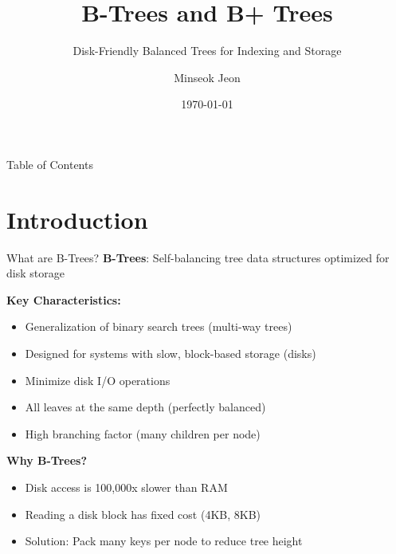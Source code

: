 \documentclass[aspectratio=169]{beamer}
\title{B-Trees and B+ Trees}
\subtitle{Disk-Friendly Balanced Trees for Indexing and Storage}
\author{Minseok Jeon}
\institute{DGIST}
\date{\today}
\begin{document}
\begin{frame}
  \titlepage
\end{frame}

\begin{frame}{Table of Contents}
  \tableofcontents
\end{frame}

\section{Introduction}

\begin{frame}{What are B-Trees?}
  \textbf{B-Trees}: Self-balancing tree data structures optimized for disk storage

  \vspace{0.3cm}
  \textbf{Key Characteristics:}
  \begin{itemize}
    \item Generalization of binary search trees (multi-way trees)
    \item Designed for systems with slow, block-based storage (disks)
    \item Minimize disk I/O operations
    \item All leaves at the same depth (perfectly balanced)
    \item High branching factor (many children per node)
  \end{itemize}

  \vspace{0.3cm}
  \textbf{Why B-Trees?}
  \begin{itemize}
    \item Disk access is 100,000x slower than RAM
    \item Reading a disk block has fixed cost (4KB, 8KB)
    \item Solution: Pack many keys per node to reduce tree height
  \end{itemize}
\end{frame}
\end{document}
